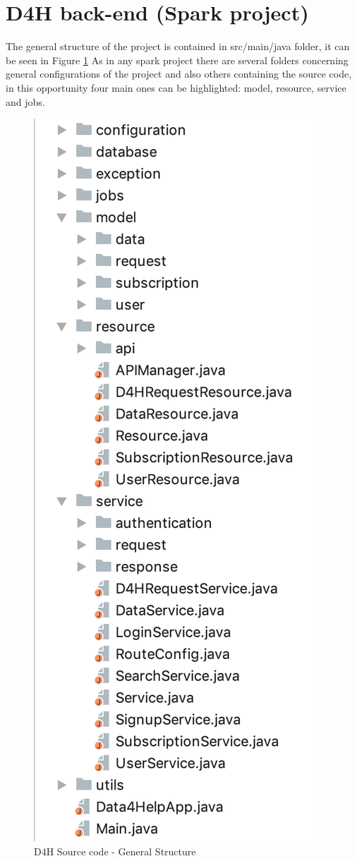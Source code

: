 \documentclass[a4paper, hidelinks, 12pt]{report}
\begin{document}
\section{D4H back-end (Spark project)}
	The general structure of the project is contained in src/main/java folder, it can be seen in Figure \ref{fig:d4h_source_code_structure} As in any spark project there are several folders concerning general configurations of the project and also others containing the source code, in this opportunity four main ones can be highlighted: model, resource, service and jobs.

	\begin{figure}[H]
		\centering
		\includegraphics[scale=0.5]{images/backend/d4h_source_code_structure.png}
		\caption[D4H Source code - General Structure]{D4H Source code - General Structure}
		\label{fig:d4h_source_code_structure}
	\end{figure}
\end{document}
